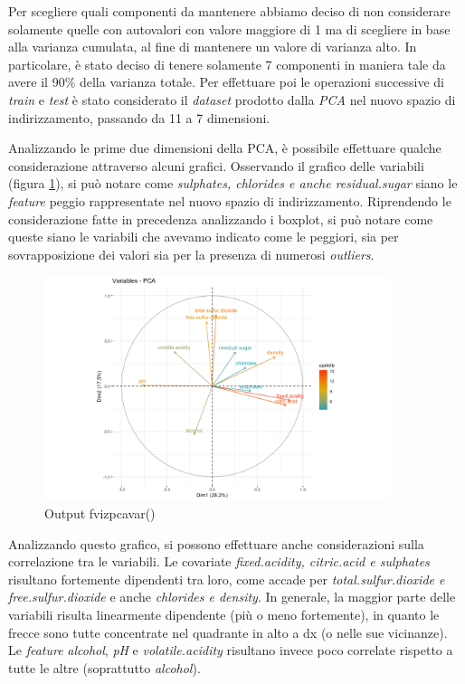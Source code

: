     Per scegliere quali componenti da mantenere abbiamo deciso di non considerare solamente quelle con autovalori con valore maggiore di 1 ma di scegliere in base alla varianza cumulata, al fine di mantenere un valore di varianza alto. In particolare, è stato deciso di tenere solamente 7 componenti in maniera tale da avere il 90\% della varianza totale. Per effettuare poi le operazioni successive di \textit{train} e \textit{test} è stato considerato il \textit{dataset} prodotto dalla \textit{PCA} nel nuovo spazio di indirizzamento, passando da 11 a 7 dimensioni.
    
    Analizzando le prime due dimensioni della PCA, è possibile effettuare qualche considerazione attraverso alcuni grafici. Osservando il grafico delle variabili (figura \ref{fig:out_pcavar}), si può notare come \textit{sulphates, chlorides e anche residual.sugar} siano le \textit{feature} peggio rappresentate nel nuovo spazio di indirizzamento. Riprendendo le considerazione fatte in precedenza analizzando i boxplot, si può notare come queste siano le variabili che avevamo indicato come le peggiori, sia per sovrapposizione dei valori sia per la presenza di numerosi \textit{outliers}. 
    
    \begin{figure}[!h]
        \includegraphics[width=0.9\textwidth]{img/Output_pcavar().png}
        \centering
        \caption{Output fvizpcavar()}
        \label{fig:out_pcavar}
    \end{figure}
    
    Analizzando questo grafico, si possono effettuare anche considerazioni sulla correlazione tra le variabili. Le covariate \textit{fixed.acidity, citric.acid e sulphates} risultano fortemente dipendenti tra loro, come accade per \textit{total.sulfur.dioxide e free.sulfur.dioxide} e anche \textit{chlorides e density}. In generale, la maggior parte delle variabili risulta linearmente dipendente (più o meno fortemente), in quanto le frecce sono tutte concentrate nel quadrante in alto a dx (o nelle sue vicinanze). Le \textit{feature} \textit{alcohol}, \textit{pH} e \textit{volatile.acidity} risultano invece poco correlate rispetto a tutte le altre (soprattutto \textit{alcohol}).

